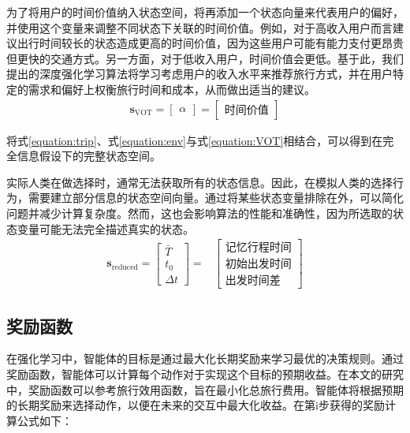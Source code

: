 为了将用户的时间价值纳入状态空间，将再添加一个状态向量来代表用户的偏好，并使用这个变量来调整不同状态下关联的时间价值。例如，对于高收入用户而言建议出行时间较长的状态造成更高的时间价值，因为这些用户可能有能力支付更昂贵但更快的交通方式。另一方面，对于低收入用户，时间价值会更低。基于此，我们提出的深度强化学习算法将学习考虑用户的收入水平来推荐旅行方式，并在用户特定的需求和偏好上权衡旅行时间和成本，从而做出适当的建议。
\begin{equation}
\begin{aligned}
\bm{s}_\text{VOT}=\left[\begin{array}{c}
\alpha
\end{array}\right]=\left[\begin{array}{c}
\text {时间价值} 
\end{array}\right]
\end{aligned}\label{equation:VOT}
\end{equation}

将式\ref{equation:trip}、式\ref{equation:env}与式\ref{equation:VOT}相结合，可以得到在完全信息假设下的完整状态空间。

实际人类在做选择时，通常无法获取所有的状态信息。因此，在模拟人类的选择行为，需要建立部分信息的状态空间向量。通过将某些状态变量排除在外，可以简化问题并减少计算复杂度。然而，这也会影响算法的性能和准确性，因为所选取的状态变量可能无法完全描述真实的状态。
\begin{equation}
\begin{aligned}
\bm{s}_\text{reduced}=\left[\begin{array}{c}
\bar{T} \\
t_{0} \\
\Delta t
\end{array}\right]=&\left[\begin{array}{c}
\text {记忆行程时间} \\
\text {初始出发时间} \\
\text {出发时间差}
\end{array}\right]
\end{aligned}\label{equation:obs}
\end{equation}



\subsection{奖励函数}
在强化学习中，智能体的目标是通过最大化长期奖励来学习最优的决策规则。通过奖励函数，智能体可以计算每个动作对于实现这个目标的预期收益。在本文的研究中，奖励函数可以参考旅行效用函数，旨在最小化总旅行费用。智能体将根据预期的长期奖励来选择动作，以便在未来的交互中最大化收益。在第i步获得的奖励计算公式如下：

